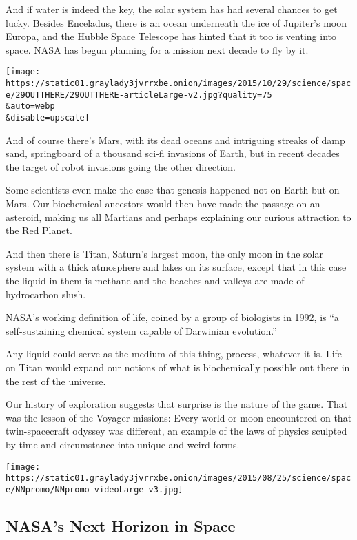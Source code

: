 And if water is indeed the key, the solar system has had several chances
to get lucky. Besides Enceladus, there is an ocean underneath the ice of
\href{http://www.nytimes3xbfgragh.onion/interactive/2015/08/25/science/space/nasa-next-mission.html}{Jupiter's
moon Europa}, and the Hubble Space Telescope has hinted that it too is
venting into space. NASA has begun planning for a mission next decade to
fly by it.

\texttt{[image: https://static01.graylady3jvrrxbe.onion/images/2015/10/29/science/space/29OUTTHERE/29OUTTHERE-articleLarge-v2.jpg?quality=75\\\&auto=webp\\\&disable=upscale]}

And of course there's Mars, with its dead oceans and intriguing streaks
of damp sand, springboard of a thousand sci-fi invasions of Earth, but
in recent decades the target of robot invasions going the other
direction.

Some scientists even make the case that genesis happened not on Earth
but on Mars. Our biochemical ancestors would then have made the passage
on an asteroid, making us all Martians and perhaps explaining our
curious attraction to the Red Planet.

And then there is Titan, Saturn's largest moon, the only moon in the
solar system with a thick atmosphere and lakes on its surface, except
that in this case the liquid in them is methane and the beaches and
valleys are made of hydrocarbon slush.

NASA's working definition of life, coined by a group of biologists in
1992, is ``a self-sustaining chemical system capable of Darwinian
evolution.''

Any liquid could serve as the medium of this thing, process, whatever it
is. Life on Titan would expand our notions of what is biochemically
possible out there in the rest of the universe.

Our history of exploration suggests that surprise is the nature of the
game. That was the lesson of the Voyager missions: Every world or moon
encountered on that twin-spacecraft odyssey was different, an example of
the laws of physics sculpted by time and circumstance into unique and
weird forms.

\href{https://www.nytimes3xbfgragh.onion/interactive/2015/08/25/science/space/nasa-next-mission.html}{}

\texttt{[image: https://static01.graylady3jvrrxbe.onion/images/2015/08/25/science/space/NNpromo/NNpromo-videoLarge-v3.jpg]}

\hypertarget{nasas-next-horizon-in-space}{%
\subsection{NASA's Next Horizon in
Space}\label{nasas-next-horizon-in-space}}

